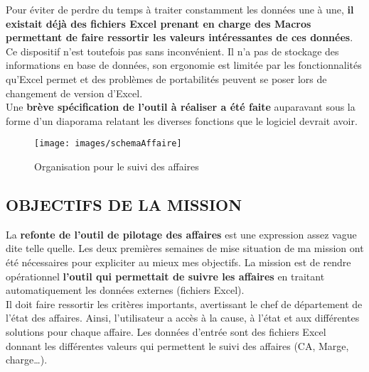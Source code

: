 Pour éviter de perdre du temps à traiter constamment les données une à une, \textbf{il existait déjà des fichiers Excel prenant en charge des Macros permettant de faire ressortir les valeurs intéressantes de ces données}. Ce dispositif n’est toutefois pas sans inconvénient. Il n’a pas de stockage des informations en base de données, son ergonomie est limitée par les fonctionnalités qu’Excel permet et des problèmes de portabilités peuvent se poser lors de changement de version d’Excel.\\

Une \textbf{brève spécification de l’outil à réaliser a été faite} auparavant sous la forme d’un diaporama relatant les diverses fonctions que le logiciel devrait avoir.

\begin{figure}[!h]
\begin{center}
\texttt{[image: images/schemaAffaire]}
\end{center}
\caption{Organisation pour le suivi des affaires}
\end{figure}

\subsection{ OBJECTIFS DE LA MISSION }
La \textbf{refonte de l’outil de pilotage des affaires} est une expression assez vague dite telle quelle. Les deux premières semaines de mise situation de ma mission ont été nécessaires pour expliciter au mieux mes objectifs.
La mission est de rendre opérationnel \textbf{l’outil qui permettait de suivre les affaires} en traitant automatiquement les données externes (fichiers Excel). \\

Il doit faire ressortir les critères importants, avertissant le chef de département de l’état des affaires. Ainsi, l’utilisateur a accès à la cause, à l’état et aux différentes solutions pour chaque affaire.
Les données d’entrée sont des fichiers Excel donnant les différentes valeurs qui permettent le suivi des affaires (CA, Marge, charge…).

